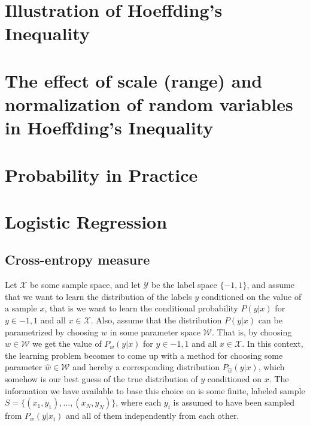 \documentclass[12pt]{article}
\begin{document}
\section{Illustration of Hoeffding's Inequality}



\section{The effect of scale (range) and normalization of random variables in Hoeffding's Inequality}



\section{Probability in Practice}



\section{Logistic Regression}



\subsection{Cross-entropy measure}

Let $\mathcal{X}$ be some sample space, and let $\mathcal{Y}$ be the label space $\{-1,1\}$, and assume that we want to learn the distribution of the labels $y$ conditioned on the value of a sample $x$, that is we want to learn the conditional probability $P(y|x)$ for $y \in {-1,1}$ and all $x\in \mathcal{X}$. Also, assume that the distribution $P(y|x)$ can be parametrized by choosing $w$ in some parameter space $\mathcal{W}$. That is, by choosing $w \in \mathcal{W}$ we get the value of $P_w(y|x)$ for $y \in {-1,1}$ and all $x\in \mathcal{X}$. In this context, the learning problem becomes to come up with a method for choosing some parameter $\hat{w} \in \mathcal{W}$ and hereby a corresponding distribution $P_{\hat{w}}(y|x)$, which somehow is our best guess of the true distribution of $y$ conditioned on $x$. The information we have available to base this choice on is some finite, labeled sample $S = \{(x_1,y_1),...,(x_N,y_N)\}$, where each $y_i$ is assumed to have been sampled from $P_w(y|x_i)$ and all of them independently from each other.
\end{document}

